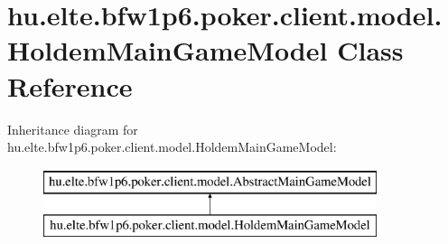 \hypertarget{classhu_1_1elte_1_1bfw1p6_1_1poker_1_1client_1_1model_1_1_holdem_main_game_model}{}\section{hu.\+elte.\+bfw1p6.\+poker.\+client.\+model.\+Holdem\+Main\+Game\+Model Class Reference}
\label{classhu_1_1elte_1_1bfw1p6_1_1poker_1_1client_1_1model_1_1_holdem_main_game_model}
Inheritance diagram for hu.\+elte.\+bfw1p6.\+poker.\+client.\+model.\+Holdem\+Main\+Game\+Model\+:\begin{figure}[H]
\begin{center}
\leavevmode
\includegraphics[height=2.000000cm]{classhu_1_1elte_1_1bfw1p6_1_1poker_1_1client_1_1model_1_1_holdem_main_game_model}
\end{center}
\end{figure}
